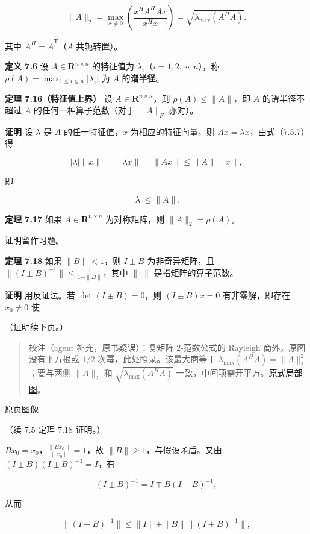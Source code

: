\documentclass[
  10pt,
  fontset=fandol]{ctexart}
\begin{document}
\[
\|A\|_2=\max_{x\neq0}\left(\frac{x^HA^HAx}{x^Hx}\right)=\sqrt{\lambda_{\max}(A^HA)}.
\]

其中 \(A^H=\overline A^{\mathrm T}\)（\(A\) 共轭转置）。

\textbf{定义 7.6} 设 \(A\in\mathbf R^{n\times n}\) 的特征值为 \(\lambda_i\)（\(i=1,2,\cdots,n\)），称 \(\rho(A)=\max_{1\leqslant i\leqslant n}|\lambda_i|\) 为 \(A\) 的\textbf{谱半径}。

\textbf{定理 7.16（特征值上界）} 设 \(A\in\mathbf R^{n\times n}\)，则 \(\rho(A)\leqslant\|A\|\)，即 \(A\) 的谱半径不超过 \(A\) 的任何一种算子范数（对于 \(\|A\|_F\) 亦对）。

\textbf{证明} 设 \(\lambda\) 是 \(A\) 的任一特征值，\(x\) 为相应的特征向量，则 \(Ax=\lambda x\)，由式（7.5.7）得

\[
|\lambda|\|x\|=\|\lambda x\|=\|Ax\|\leqslant\|A\|\|x\|,
\]

即

\[
|\lambda|\leqslant\|A\|.
\]

\textbf{定理 7.17} 如果 \(A\in\mathbf R^{n\times n}\) 为对称矩阵，则 \(\|A\|_2=\rho(A)\)。

证明留作习题。

\textbf{定理 7.18} 如果 \(\|B\|<1\)，则 \(I\pm B\) 为非奇异矩阵，且 \(\|(I\pm B)^{-1}\|\leqslant\frac1{1-\|B\|}\)，其中 \(\|\cdot\|\) 是指矩阵的算子范数。

\textbf{证明} 用反证法。若 \(\det(I\pm B)=0\)，则 \((I\pm B)x=0\) 有非零解，即存在 \(x_0\neq0\) 使

（证明续下页。）

\begin{quote}
校注（agent 补充，原书疑误）：复矩阵 2-范数公式的 Rayleigh 商外，原图没有平方根或 \(1/2\) 次幂，此处照录。该最大商等于 \(\lambda_{\max}(A^HA)=\|A\|_2^2\)；要与两侧 \(\|A\|_2\) 和 \(\sqrt{\lambda_{\max}(A^HA)}\) 一致，中间项需开平方。\href{../assets/ch07b/204-complex-norm.png}{原式局部图}。
\end{quote}

\href{../../source-images/pdf-205.jpeg}{原页图像}

（续 7.5 定理 7.18 证明。）

\(Bx_0=x_0\)，\(\frac{\|Bx_0\|}{\|x_0\|}=1\)，故 \(\|B\|\geqslant1\)，与假设矛盾。又由 \((I\pm B)(I\pm B)^{-1}=I\)，有

\[
(I\pm B)^{-1}=I\mp B(I-B)^{-1},
\]

从而

\[
\|(I\pm B)^{-1}\|\leqslant\|I\|+\|B\|\|(I\pm B)^{-1}\|,
\]
\end{document}
